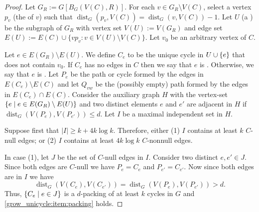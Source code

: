 \documentclass{patmorin}
\DeclareMathOperator{\dist}{dist}
\DeclarePairedDelimiter\set{\{}{\}}
\begin{document}
\begin{proof}
  Let $G_{R}:=G[B_G(V(C),R)]$. 
  For each $v\in G_{R}\setminus V(C)$, select a vertex $p_v$ (the  of $v$) such that $\dist_G(p_v,V(C))=\dist_G(v,V(C))-1$.
  Let $U$ (a ) be the subgraph of $G_{R}$ with vertex set $V(U):=V(G_{R})$ and edge set $E(U):=E(C)\cup\{vp_v:v\in V(U)\setminus V(C)\}$.  Let $v_0$ be an arbitrary vertex of $C$. 
  
  Let $e\in E(G_{R})\setminus E(U)$. 
  We define $C_e$ to be the unique cycle in $U\cup \set{e}$ that does not contain $v_0$.
  If $C_e$ has no edges in $C$ then we say that $e$ is . 
  Otherwise, we say that $e$ is .
  Let $P_{e}$ be the path or cycle formed by the edges in $E(C_{e})\setminus E(C)$ and let $Q_{vw}$ be the (possibly empty) path formed by the edges in $E(C_{e})\cap E(C)$.  
  Consider the auxiliary graph $H$ with the vertex-set $\set{e\mid e\in E(G_{R})\setminus E(U)}$ and two distinct elements $e$ and $e'$ are adjacent in $H$ if $\dist_G(V(P_{e}),V(P_{e'})) \le d$.  Let $I$ be a maximal independent set in $H$. 

  Suppose first that $|I|\ge k+4k\log k$. 
  Therefore, 
  either (1) $I$ contains at least $k$ $C$-null edges; 
  or (2) $I$ contains at least $4k\log k$ $C$-nonnull edges.

  In case (1), let $J$ be the set of $C$-null edges in $I$.
  Consider two distinct $e,e'\in J$. 
  Since both edges are $C$-null we have $P_e=C_e$ and $P_{e'}=C_{e'}$.
  Now since both edges are in $I$ we have 
  \[
  \dist_G(V(C_e),V(C_{e'}))=\dist_G(V(P_e),V(P_{e'}))>d.
  \]
  Thus, $\set{C_e \mid e\in J}$ is a $d$-packing of at least $k$ cycles in $G$ and \eqref{grow_unicycle:item:packing} holds.


\end{proof}
\end{document}
